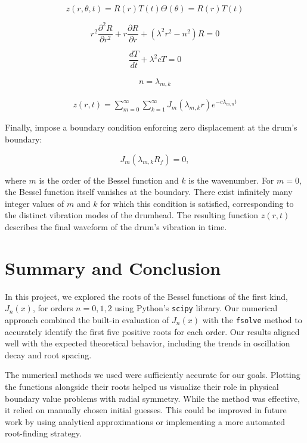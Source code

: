 \documentclass[linenumbers, twocolumn]{aastex631}
\begin{document}
\begin{equation}
    z(r,\theta,t)=R(r)T(t)\Theta(\theta)=R(r)T(t)
\end{equation}

\begin{equation}
    r^2\frac{\partial^2R}{\partial r^2}+r\frac{\partial R}{\partial r}+(\lambda^2r^2-n^2)R=0
\end{equation}

\begin{equation}
    \frac{dT}{dt}+\lambda^2cT=0
\end{equation}

\begin{eqnarray}
    n=\lambda_{m,k}
\end{eqnarray}

\begin{eqnarray}
    z(r,t)=\sum_{m=0}^\infty \sum_{k=1}^\infty J_m(\lambda_{m,k}r)e^{-c\lambda_{m,n}t}
\end{eqnarray}

\noindent Finally, impose a boundary condition enforcing zero displacement at
the drum's boundary:

\begin{equation}
    J_m(\lambda_{m,k}R_f)=0,
\end{equation}

\noindent where $m$ is the order of the Bessel function and $k$ is the wavenumber.
For $m=0$, the Bessel function itself vanishes at the boundary. There exist infinitely
many integer values of $m$ and $k$ for which this condition is satisfied, corresponding
to the distinct vibration modes of the drumhead. The resulting function $z(r,t)$
describes the final waveform of the drum's vibration in time.


\section{Summary and Conclusion} \label{sec:summary}

In this project, we explored the roots of the Bessel functions of the first kind, 
$J_n(x)$, for orders $n=0,1,2$ using Python's \texttt{scipy} library. Our numerical
approach combined the built-in evaluation of $J_n(x)$ with the \texttt{fsolve}
method to accurately identify the first five positive roots for each order. Our
results aligned well with the expected theoretical behavior, including the trends
in oscillation decay and root spacing.

\noindent The numerical methods we used were sufficiently accurate for our goals.
Plotting the functions alongside their roots helped us visualize their role in
physical boundary value problems with radial symmetry. While the method was
effective, it relied on manually chosen initial guesses. This could be improved in
future work by using analytical approximations or implementing a more automated
root-finding strategy.
\end{document}
